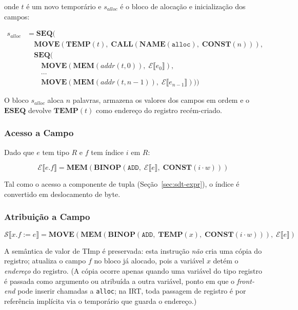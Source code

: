onde \(t\) é um novo temporário e \(s_{\mathit{alloc}}\) é o bloco de
alocação e inicialização dos campos:

\[
  \begin{aligned}
    s_{\mathit{alloc}}
    &= \mathbf{SEQ}( \\
      &\quad \mathbf{MOVE}(\mathbf{TEMP}(t),\;
      \mathbf{CALL}(\mathbf{NAME}(\texttt{alloc}),\; \mathbf{CONST}(n))), \\
      &\quad \mathbf{SEQ}( \\
        &\qquad \mathbf{MOVE}(\mathbf{MEM}(\mathit{addr}(t,0)),\;
        \mathcal{E}\llbracket e_0 \rrbracket), \\
        &\qquad \cdots \\
        &\qquad \mathbf{MOVE}(\mathbf{MEM}(\mathit{addr}(t,n-1)),\;
    \mathcal{E}\llbracket e_{n-1} \rrbracket)))
  \end{aligned}
\]

O bloco \(s_{\mathit{alloc}}\) aloca
\(n\) palavras, armazena os valores dos campos em ordem e o
\(\mathbf{ESEQ}\) devolve \(\mathbf{TEMP}(t)\) como endereço do registro
recém-criado.

\subsubsection*{Acesso a Campo}

Dado que \(e\) tem tipo \(R\) e \(f\) tem índice \(i\) em \(R\):

\[
  \mathcal{E}\llbracket e.f \rrbracket =
  \mathbf{MEM}\!\left(
    \mathbf{BINOP}(\mathtt{ADD},\;
      \mathcal{E}\llbracket e \rrbracket,\;
    \mathbf{CONST}(i \cdot w))
  \right)
\]

Tal como o acesso a componente de tupla (Seção~\ref{sec:sdt-expr}), o
índice é convertido em deslocamento de byte.

\subsubsection*{Atribuição a Campo}

\[
  \mathcal{S}\llbracket x.f \mathbin{:=} e \rrbracket =
  \mathbf{MOVE}\!\left(
    \mathbf{MEM}\!\left(
      \mathbf{BINOP}(\mathtt{ADD},\;
        \mathbf{TEMP}(x),\;
      \mathbf{CONST}(i \cdot w))
    \right),\;
    \mathcal{E}\llbracket e \rrbracket
  \right)
\]

A semântica de valor de TImp é preservada: esta instrução \emph{não} cria
uma cópia do registro; atualiza o campo \(f\) no bloco já alocado, pois a
variável \(x\) detém o \emph{endereço} do registro. (A cópia ocorre apenas
  quando uma variável do tipo registro é passada como argumento ou atribuída
  a outra variável, ponto em que o \emph{front-end} pode inserir chamadas a
  \texttt{alloc}; na IRT, toda passagem de registro é por referência implícita
via o temporário que guarda o endereço.)

